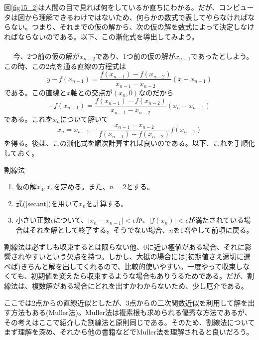 図\ref{fig15_2}は人間の目で見れば何をしているか直ちにわかる。だが、コンピュータは図から理解できるわけではないため、何らかの数式で表してやらなければならない。つまり、それまでの仮の解から、次の仮の解を数式によって決定しなければならないのである。以下、この漸化式を導出してみよう。
\\ \\　
今、2つ前の仮の解が$x_{n-2}$であり、1つ前の仮の解が$x_{n-1}$であったとしよう。この時、この2点を通る直線の方程式は
\begin{equation}
y-f(x_{n-1})=\frac{f(x_{n-1})-f(x_{n-2})}{x_{n-1}-x_{n-2}}(x-x_{n-1})
\end{equation}
である。この直線と$x$軸との交点が$(x_n,0)$なのだから
\begin{equation}
-f(x_{n-1})=\frac{f(x_{n-1})-f(x_{n-2})}{x_{n-1}-x_{n-2}}(x_n-x_{n-1})
\end{equation}
である。これを$x_n$について解いて
\begin{equation}
x_n=x_{n-1}-\frac{x_{n-1}-x_{n-2}}{f(x_{n-1})-f(x_{n-2})}f(x_{n-1}) \label{secant}
\end{equation}
を得る。後は、この漸化式を順次計算すれば良いのである。以下、これを手順化しておく。
\begin{itembox}[l]{割線法}
\begin{enumerate}
\item 仮の解$x_0,x_1$を定める。また、$n=2$とする。
\item 式(\ref{secant})を用いて$x_n$を計算する。
\item 小さい正数$\epsilon$について、$|x_{n}-x_{n-1}|<\epsilon$か、$|f(x_{n})|<\epsilon$が満たされている場合はそれを解として終了する。そうでない場合、$n$を1増やして前項に戻る。
\end{enumerate}
\end{itembox}

割線法は必ずしも収束するとは限らない他、0に近い極値がある場合、それに影響されやすいという欠点を持つ。しかし、大抵の場合には(初期値さえ適切に選べば)きちんと解を出してくれるので、比較的使いやすい。一度やって収束しなくても、初期値を変えたら収束するような場合もありうるためである。だが、割線法は、複数解がある場合にどれを出すかわからないため、少し厄介である。

ここでは2点からの直線近似としたが、3点からの二次関数近似を利用して解を出す方法もある(Muller法)。Muller法は複素根も求められる優秀な方法であるが、その考えはここで紹介した割線法と原則同じである。そのため、割線法についてまず理解を深め、それから他の書籍などでMuller法を理解されると良いだろう。

